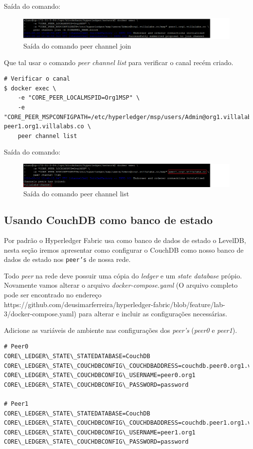 \documentclass[a4paper,11pt]{article}
\begin{document}
Saída do comando:
\begin{figure}[H]
  \centering
  \includegraphics[width=1.1\textwidth]{imagens/output-org1-peer1-join.png}
  \caption{Saída do comando peer channel join}
\end{figure}

Que tal usar o comando \textit{peer channel list} para verificar o canal recém criado.
\begin{lstlisting}
# Verificar o canal
$ docker exec \
    -e "CORE_PEER_LOCALMSPID=Org1MSP" \
    -e "CORE_PEER_MSPCONFIGPATH=/etc/hyperledger/msp/users/Admin@org1.villalabs.co/msp" peer1.org1.villalabs.co \
    peer channel list
\end{lstlisting}

Saída do comando:
\begin{figure}[H]
  \centering
  \includegraphics[width=1.1\textwidth]{imagens/output-org1-peer1-list.png}
  \caption{Saída do comando peer channel list}
\end{figure}

\subsection{Usando CouchDB como banco de estado}
Por padrão o Hyperledger\cite{hyperledger} Fabric\cite{hyperledgerfabric} usa como banco de dados de estado o LevelDB, nesta seção iremos apresentar como configurar o CouchDB como nosso banco de dados de estado nos \texttt{peer's} de nossa rede.

Todo \textit{peer} na rede deve possuir uma cópia do \textit{ledger} e um \textit{state database} própio. Novamente vamos alterar o arquivo \textit{docker-compose.yaml} (O arquivo completo pode ser encontrado no endereço https://github.com/deusimarferreira/hyperledger-fabric/blob/feature/lab-3/docker-compose.yaml) para alterar e incluir as configurações necessárias.

Adicione as variáveis de ambiente nas configurações dos \textit{peer's} (\textit{peer0} e \textit{peer1}).
\begin{lstlisting}
# Peer0
CORE\_LEDGER\_STATE\_STATEDATABASE=CouchDB
CORE\_LEDGER\_STATE\_COUCHDBCONFIG\_COUCHDBADDRESS=couchdb.peer0.org1.villalabs.co:5984
CORE\_LEDGER\_STATE\_COUCHDBCONFIG\_USERNAME=peer0.org1
CORE\_LEDGER\_STATE\_COUCHDBCONFIG\_PASSWORD=password

# Peer1
CORE\_LEDGER\_STATE\_STATEDATABASE=CouchDB
CORE\_LEDGER\_STATE\_COUCHDBCONFIG\_COUCHDBADDRESS=couchdb.peer1.org1.villalabs.co:5984
CORE\_LEDGER\_STATE\_COUCHDBCONFIG\_USERNAME=peer1.org1
CORE\_LEDGER\_STATE\_COUCHDBCONFIG\_PASSWORD=password
\end{lstlisting}
\end{document}
